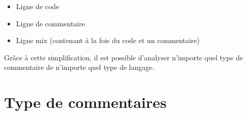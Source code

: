 \documentclass[10pt,a4paper,twoside, openany]{report}
\begin{document}
\begin{itemize}
\item{Ligne de code}
\item{Ligne de commentaire}
\item{Ligne mix (contenant \`a la fois du code et un commentaire)}
\end{itemize}

Gr\^ace \`a cette simplification, il est possible d'analyser n'importe quel type de commentaire de n'importe quel type de langage.

\section{Type de commentaires}

\end{document}
